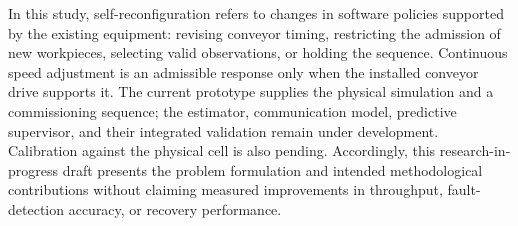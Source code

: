 In this study, self-reconfiguration refers to changes in software policies supported by the existing equipment: revising conveyor timing, restricting the admission of new workpieces, selecting valid observations, or holding the sequence. Continuous speed adjustment is an admissible response only when the installed conveyor drive supports it. The current prototype supplies the physical simulation and a commissioning sequence; the estimator, communication model, predictive supervisor, and their integrated validation remain under development. Calibration against the physical cell is also pending. Accordingly, this research-in-progress draft presents the problem formulation and intended methodological contributions without claiming measured improvements in throughput, fault-detection accuracy, or recovery performance.

